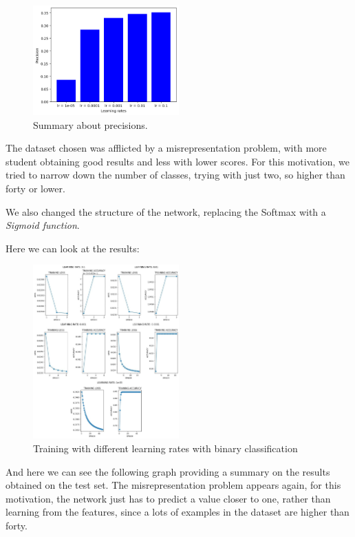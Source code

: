 \documentclass{article}
\begin{document}
\begin{figure}[h!]
    \centering
    \includegraphics[width=0.5\textwidth]{results.png}
    \caption{\label{fig:summary}Summary about precisions.}
\end{figure}

The dataset chosen was afflicted by a misrepresentation problem, with more student obtaining good results and less with lower scores. For this motivation, we tried to narrow down the number of classes,
trying with just two, so higher than forty or lower.

We also changed the structure of the network, replacing the Softmax with a \emph{Sigmoid function}.

Here we can look at the results:

\begin{figure}[h!]
    \centering
    \includegraphics[width=0.5\textwidth]{binary_lr.jpg}
    \caption{\label{fig:binary_lr}Training with different learning rates with binary classification}
\end{figure}

And here we can see the following graph providing a summary on the results obtained on the test set. The misrepresentation problem appears again, 
for this motivation, the network just has to predict a value closer to one, rather than learning from the features, since a lots of examples in the dataset
are higher than forty.
\end{document}
